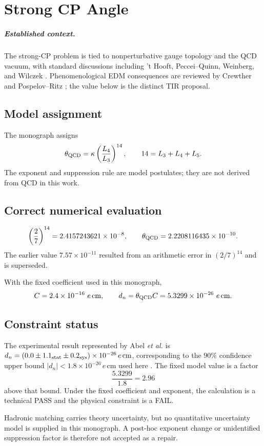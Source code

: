 \chapter{Strong CP Angle}
\label{ch:strong_cp}

\paragraph{Established context.}
The strong-CP problem is tied to nonperturbative gauge topology and the QCD
vacuum, with standard discussions including 't Hooft, Peccei--Quinn, Weinberg,
and Wilczek \cite{tHooft1976,PecceiQuinn1977,Weinberg1978Axion,Wilczek1978Axion}.
Phenomenological EDM consequences are reviewed by Crewther and Pospelov--Ritz
\cite{crewther1979,pospelov2005}; the value below is the distinct TIR proposal.


\section{Model assignment}
The monograph assigns
\begin{equation}
  \theta_{\rm QCD}=\kappa\left(\frac{L_4}{L_3}\right)^{14},
  \qquad 14=L_3+L_4+L_5.
  \label{eq:theta_qcd}
\end{equation}
The exponent and suppression rule are model postulates; they are not derived from
QCD in this work.

\section{Correct numerical evaluation}
\[
\left(\frac27\right)^{14}=2.4157243621\times10^{-8},
\qquad
\theta_{\rm QCD}=2.2208116435\times10^{-10}.
\]
The earlier value $7.57\times10^{-11}$ resulted from an arithmetic error in
$(2/7)^{14}$ and is superseded.

With the fixed coefficient used in this monograph,
\[
  C=2.4\times10^{-16}\ e\,\mathrm{cm},
  \qquad
  d_n=\theta_{\rm QCD}C
  =5.3299\times10^{-26}\ e\,\mathrm{cm}.
\]

\section{Constraint status}
The experimental result represented by Abel \emph{et al.} is
$d_n=(0.0\pm1.1_{\rm stat}\pm0.2_{\rm sys})\times10^{-26}\,e\,\mathrm{cm}$,
corresponding to the $90\%$ confidence upper bound
$|d_n|<1.8\times10^{-26}\,e\,\mathrm{cm}$ used here
\cite{Abel2020nEDM}.  The fixed model value is a factor
\[
  \frac{5.3299}{1.8}=2.96
\]
above that bound.  Under the fixed coefficient and exponent, the calculation is
a technical PASS and the physical constraint is a FAIL.

Hadronic matching carries theory uncertainty, but no quantitative uncertainty
model is supplied in this monograph.  A post-hoc exponent change or unidentified
suppression factor is therefore not accepted as a repair.
